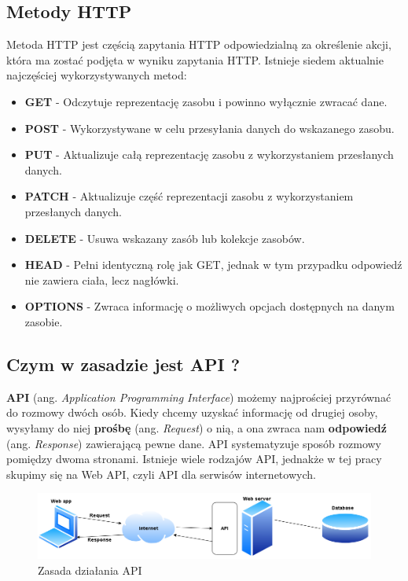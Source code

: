 \documentclass[oneside,polski,logo,indent]{amuthesis}
\begin{document}
\begin{center}
\subsection{Metody HTTP}
\end{center}
Metoda HTTP jest częścią zapytania HTTP odpowiedzialną za określenie akcji, która ma zostać podjęta w wyniku zapytania HTTP. Istnieje siedem aktualnie najczęściej wykorzystywanych metod:

\begin{itemize}
\item \textbf{GET} - Odczytuje reprezentację zasobu i powinno wyłącznie zwracać dane.
\item \textbf{POST} - Wykorzystywane w celu przesyłania danych do wskazanego zasobu.
\item \textbf{PUT} - Aktualizuje całą reprezentację zasobu z wykorzystaniem przesłanych danych.
\item \textbf{PATCH} - Aktualizuje część reprezentacji zasobu z wykorzystaniem przesłanych danych.
\item \textbf{DELETE} - Usuwa wskazany zasób lub kolekcje zasobów.
\item \textbf{HEAD} - Pełni identyczną rolę jak GET, jednak w tym przypadku odpowiedź nie zawiera ciała, lecz nagłówki.
\item \textbf{OPTIONS} - Zwraca informację o możliwych opcjach dostępnych na danym zasobie.
\end{itemize}


\begin{center}
\subsection{Czym w zasadzie jest API ?}
\end{center}
\textbf{API} (ang. \emph{Application Programming Interface}) możemy najprościej przyrównać do rozmowy dwóch osób. Kiedy chcemy uzyskać informację od drugiej osoby,  wysyłamy do niej \textbf{prośbę} (ang. \emph{Request}) o nią, a ona zwraca nam \textbf{odpowiedź} (ang. \emph{Response}) zawierającą pewne dane.  API systematyzuje sposób rozmowy pomiędzy dwoma stronami. Istnieje wiele rodzajów API, jednakże w tej pracy skupimy się na Web API, czyli API dla serwisów internetowych. 

\begin{figure}[H]
\centering
\includegraphics[width=14cm]{api.png}
\caption{Zasada działania API}
\label{Cache}
\end{figure}
\end{document}
